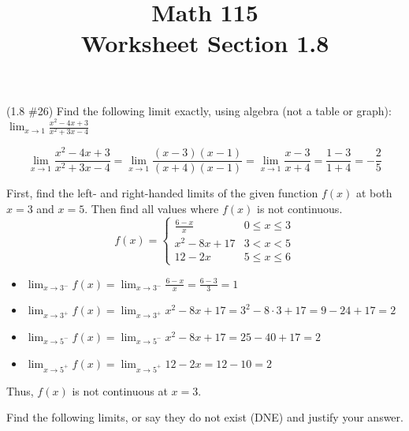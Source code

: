 \documentclass[11pt]{exam}
\title{\vspace{-0.5in} Math 115 \\ Worksheet Section 1.8}
\date{}
\newcommand{\plainanswer}[1]{\ifprintanswers #1 \fi}
\begin{document}
\maketitle
\vspace{-0.75in}
\begin{questions}
  \question (1.8 \#26) Find the following limit exactly, using algebra (not a table or graph):
	$\displaystyle\lim_{x \to 1} \frac{x^2-4x+3}{x^2+3x-4}$
        \begin{solution}
          \[
            \lim_{x \to 1}\frac{x^2-4x+3}{x^2+3x-4} = \lim_{x\to 1}
            \frac{(x-3)(x-1)}{(x+4)(x-1)} = \lim_{x\to
              1}\frac{x-3}{x+4} = \frac{1-3}{1+4} = -\frac{2}{5}
          \]
        \end{solution}
  \question First, find the left- and right-handed limits of the given function $f(x)$ at both $x=3$ and $x=5$.  Then find all values where $f(x)$ is not continuous.
	$$f(x) = \left\{ \begin{array}{ll} \displaystyle\frac{6-x}{x} & 0\leq x \leq 3
	\\ x^2-8x+17 & 3<x<5
	\\ 12-2x & 5\leq x \leq 6
	\end{array}
	\right.$$
        \begin{solution}
          \begin{itemize}
          \item \(\displaystyle\lim_{x\to 3^-} f(x) = \lim_{x \to 3^-}
            \frac{6-x}{x} = \frac{6-3}{3} = 1\)
          \item \(\displaystyle\lim_{x\to 3^+} f(x) = \lim_{x \to 3^+} x^2-8x+17 =
            3^2-8\cdot 3 + 17 = 9-24+17 = 2\)
          \item \(\displaystyle\lim_{x\to 5^-} f(x) = \lim_{x \to 5^-}
            x^2-8x+17 = 25-40+17 = 2\) 
          \item \(\displaystyle\lim_{x\to 5^+} f(x) = \lim_{x \to 5^+}
            12-2x = 12-10 = 2\)
          \end{itemize}
          Thus, \(f(x)\) is not continuous at \(x=3\).
        \end{solution}
        \vspace{1in}
  \question Find the following limits, or say they do not exist (DNE)
  and justify your answer.
\end{questions}
\end{document}

